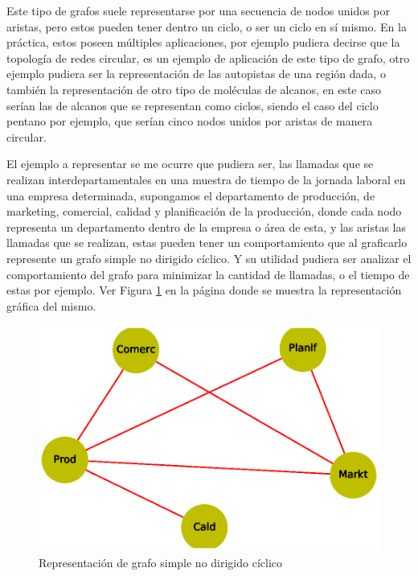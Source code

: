 \documentclass{article}
\begin{document}
Este tipo de grafos suele representarse por una secuencia de nodos unidos por aristas, pero estos pueden tener dentro un ciclo, o ser un ciclo en sí mismo. En la práctica, estos poseen múltiples aplicaciones, por ejemplo pudiera decirse que la topología de redes circular, es un ejemplo de aplicación de este tipo de grafo, otro ejemplo pudiera ser la representación de las autopistas de una región dada, o también la representación de otro tipo de moléculas de alcanos, en este caso serían las de alcanos que se representan como ciclos, siendo el caso del ciclo pentano por ejemplo, que serían cinco nodos unidos por aristas de manera circular. 

El ejemplo a representar se me ocurre que pudiera ser, las llamadas que se realizan interdepartamentales en una muestra de tiempo de la jornada laboral en una empresa determinada, supongamos el departamento de producción, de marketing, comercial, calidad y planificación de la producción, donde cada nodo representa un departamento dentro de la empresa o área de esta, y las aristas las llamadas que se realizan, estas pueden tener un comportamiento que al graficarlo represente un grafo simple no dirigido cíclico. Y su utilidad pudiera ser analizar el comportamiento del grafo para minimizar la cantidad de llamadas, o el tiempo de estas por ejemplo.   Ver Figura \ref{fig:Fig02} en la página \pageref{fig:Fig02} donde se muestra la representación gráfica del mismo.




\begin{figure}
    \centering
    \includegraphics[scale=0.4]{imagenes/Fig02.eps}
    \caption{Representación de grafo simple no dirigido cíclico}
    \label{fig:Fig02}
\end{figure}
\end{document}
